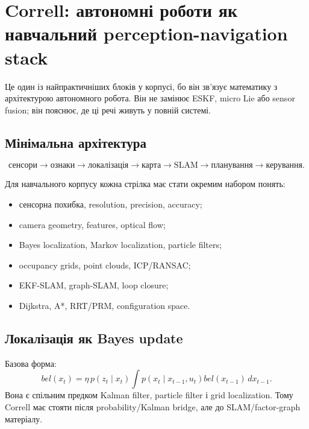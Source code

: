 \chapter{Correll: автономні роботи як навчальний perception-navigation stack}
\label{chap:correll-curriculum}


Це один із найпрактичніших блоків у корпусі, бо він зв'язує математику з архітектурою автономного робота. Він не замінює ESKF, micro Lie або sensor fusion; він пояснює, де ці речі живуть у повній системі.

\section{Мінімальна архітектура}

\begin{equation}
  \text{сенсори} \rightarrow \text{ознаки} \rightarrow \text{локалізація} \rightarrow \text{карта} \rightarrow \text{SLAM} \rightarrow \text{планування} \rightarrow \text{керування}.
\end{equation}

Для навчального корпусу кожна стрілка має стати окремим набором понять:
\begin{itemize}[leftmargin=*]
\item сенсорна похибка, resolution, precision, accuracy;
\item camera geometry, features, optical flow;
\item Bayes localization, Markov localization, particle filters;
\item occupancy grids, point clouds, ICP/RANSAC;
\item EKF-SLAM, graph-SLAM, loop closure;
\item Dijkstra, A*, RRT/PRM, configuration space.
\end{itemize}

\section{Локалізація як Bayes update}

Базова форма:
\begin{equation}
  bel(x_t)=\eta\,p(z_t\mid x_t)\int p(x_t\mid x_{t-1},u_t)bel(x_{t-1})\,dx_{t-1}.
\end{equation}
Вона є спільним предком Kalman filter, particle filter і grid localization. Тому Correll має стояти після probability/Kalman bridge, але до SLAM/factor-graph матеріалу.

